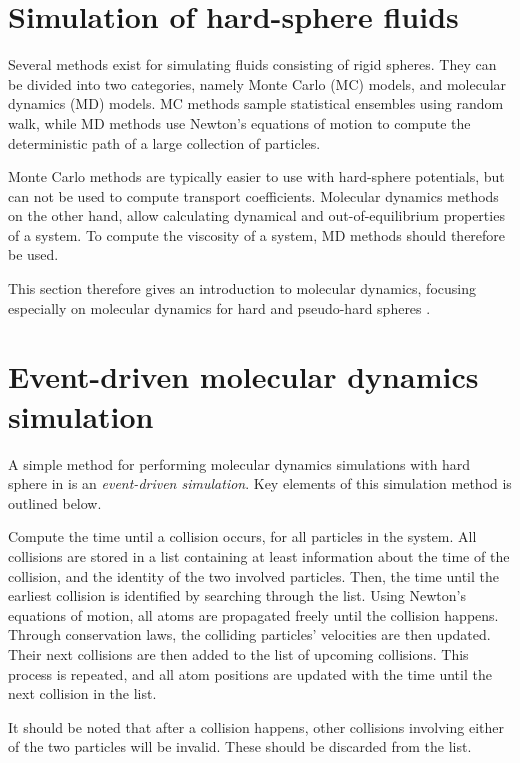 \section{Simulation of hard-sphere fluids}
Several methods exist for simulating fluids 
consisting of rigid spheres. They can be 
divided into two categories, namely Monte 
Carlo (MC) models, and molecular dynamics 
(MD) models. MC methods sample statistical 
ensembles using random walk,  %
while MD methods use Newton's equations of 
motion to compute the deterministic path 
of a large collection of particles.

Monte Carlo methods are typically easier to 
use with hard-sphere potentials, but can not 
be used to compute transport coefficients. 
Molecular dynamics methods on the other 
hand, allow calculating dynamical and 
out-of-equilibrium properties of a system. 
To compute the viscosity of a system, 
MD methods should therefore be used. 

This section therefore gives an introduction 
to molecular dynamics, focusing especially on 
molecular dynamics for hard and pseudo-hard 
spheres \cite{ref:allen:MD_sim}.

\section{Event-driven molecular dynamics simulation}
A simple method for performing molecular 
dynamics simulations with hard sphere in 
is an \emph{event-driven simulation}. 
Key elements of this simulation method 
is outlined below.

Compute the time until a collision occurs, for all particles in the system.
All collisions are stored in a list containing at least information about
the time of the collision, and the identity of the two involved particles.
Then, the time until the earliest collision is identified by searching through the list.
Using Newton's equations of motion, all atoms are propagated freely until
the collision happens.
Through conservation laws, the colliding particles' velocities are then updated.
Their next collisions are then added to the list of upcoming collisions.
This process is repeated, and all atom positions are updated with the time 
until the next collision in the list.

It should be noted that after a collision happens, other collisions involving
either of the two particles will be invalid.
These should be discarded from the list.

